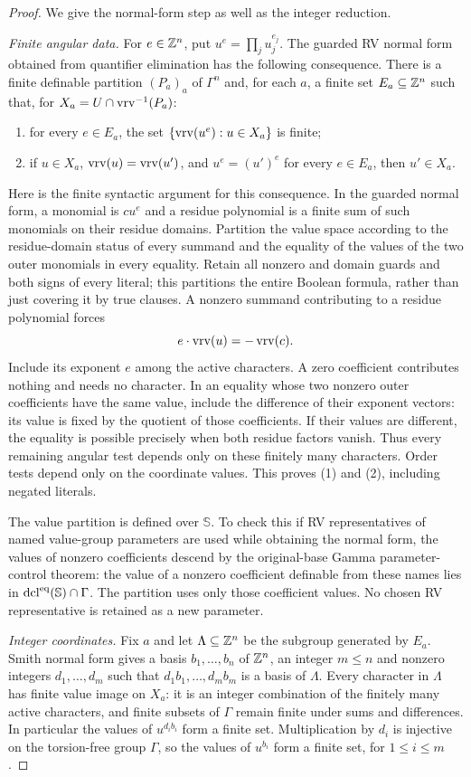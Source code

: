 \begin{proof}
We give the normal-form step as well as the integer reduction.

\emph{Finite angular data.}
For $e\in\mathbb Z^n$, put $u^e=\prod_j u_j^{e_j}$.
The guarded RV normal form obtained from quantifier elimination has
the following consequence. There is a finite definable partition
$(P_a)_a$ of $\Gamma^n$ and, for each $a$, a finite set
$E_a\subseteq\mathbb Z^n$ such that, for $X_a=U\cap\operatorname{vrv}^{-1}(P_a)$:
\begin{enumerate}
\item for every $e\in E_a$, the set
$\{\operatorname{vrv}(u^e):u\in X_a\}$ is finite;
\item if $u\in X_a$, $\operatorname{vrv}(u)=\operatorname{vrv}(u')$, and
$u^e=(u')^e$ for every $e\in E_a$, then $u'\in X_a$.
\end{enumerate}
Here is the finite syntactic argument for this consequence.
In the guarded normal form, a monomial is $c u^e$ and a residue
polynomial is a finite sum of such monomials on their residue
domains. Partition the value space according to the residue-domain
status of every summand and the equality of the values of the two
outer monomials in every equality. Retain all nonzero and domain
guards and both signs of every literal; this partitions the entire
Boolean formula, rather than just covering it by true clauses.
A nonzero summand contributing to a residue polynomial forces
\[
 e\cdot\operatorname{vrv}(u)=-\operatorname{vrv}(c).
\]
Include its exponent $e$ among the active characters. A zero
coefficient contributes nothing and needs no character.
In an equality whose two nonzero outer coefficients have the same
value, include the difference of their exponent vectors: its value
is fixed by the quotient of those coefficients. If their values are
different, the equality is possible precisely when both residue
factors vanish. Thus every remaining angular test depends only on
these finitely many characters. Order tests depend only on the
coordinate values. This proves (1) and (2), including negated
literals.

The value partition is defined over $\mathbb S$. To check this if RV
representatives of named value-group parameters are used while
obtaining the normal form, the values of nonzero coefficients
descend by the original-base Gamma parameter-control theorem:
the value of a nonzero coefficient definable from these names
lies in $\operatorname{dcl}^{\mathrm{eq}}(\mathbb S)\cap\Gamma$.
The partition uses only those coefficient values. No chosen
RV representative is retained as a new parameter.

\emph{Integer coordinates.}
Fix $a$ and let $\Lambda\subseteq\mathbb Z^n$ be the subgroup generated by
$E_a$. Smith normal form gives a basis $b_1,\ldots,b_n$ of $\mathbb Z^n$,
an integer $m\leq n$ and nonzero integers $d_1,\ldots,d_m$ such that
$d_1b_1,\ldots,d_mb_m$ is a basis of $\Lambda$.
Every character in $\Lambda$ has finite value image on $X_a$:
it is an integer combination of the finitely many active characters,
and finite subsets of $\Gamma$ remain finite under sums and differences.
In particular the values of $u^{d_i b_i}$ form a finite set.
Multiplication by $d_i$ is injective on the torsion-free group $\Gamma$,
so the values of $u^{b_i}$ form a finite set, for $1\leq i\leq m$.


\end{proof}

